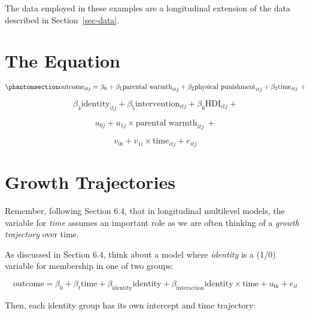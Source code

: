 \documentclass[
  letterpaper,
  DIV=11,
  numbers=noendperiod]{scrreprt}
\begin{document}
The data employed in these examples are a longitudinal extension of the
data described in Section~\ref{sec-data}.

\section{The Equation}\label{the-equation-2}

\begin{equation}\phantomsection\label{eq-MLM-longitudinal}{\text{outcome}_{itj} = \beta_0 + \beta_1 \text{parental warmth}_{itj} + \beta_2 \text{physical punishment}_{itj} + \beta_3 \text{time}_{itj} \ + }\end{equation}

\[\beta_4 \text{identity}_{itj} + \beta_5 \text{intervention}_{itj} + \beta_6 \text{HDI}_{itj} +\]

\[u_{0j} + u_{1j} \times \text{parental warmth}_{itj} \ + \]

\[v_{0i} + v_{1i} \times \text{time}_{itj} + e_{itj}\]

\section{Growth Trajectories}\label{growth-trajectories}

Remember, following Section 6.4, that in longitudinal multilevel models,
the variable for \emph{time} assumes an important role as we are often
thinking of a \emph{growth trajectory} over time.

As discussed in Section 6.4, think about a model where \emph{identity}
is a (1/0) variable for membership in one of two groups:

\[\text{outcome} = \beta_0 + \beta_t \text{time} + \beta_\text{identity} \text{identity} + \beta_\text{interaction} \text{identity} \times \text{time} + u_{0i} + e_{it}\]

Then, each identity group has its own intercept and time trajectory:
\end{document}
